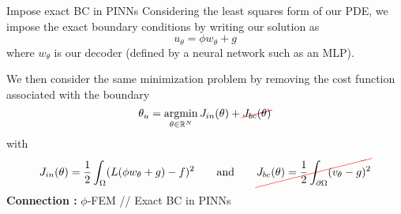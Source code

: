 \begin{frame}{Impose exact BC in PINNs}
	Considering the least squares form of our PDE, we impose the exact boundary conditions by writing our solution as
	\begin{equation*}
		u_\theta=\phi w_\theta + g
	\end{equation*}
	where $w_\theta$ is our decoder (defined by a neural network such as an MLP).
	
	We then consider the same minimization problem by removing the cost function associated with the boundary
	\begin{equation*}
		\displaystyle \theta_u=\argmin_{\theta\in\mathbb{R}^N} J_{in}(\theta)+\Ccancel[red]{J_{bc}(\theta)}
	\end{equation*}
	with 
	\begin{equation*}
		J_{in}(\theta)=\frac{1}{2}\int_\Omega (L(\phi w_\theta + g) - f)^2  \qquad \text{and} \qquad \Ccancel[red]{J_{bc}(\theta)=\frac{1}{2}\int_{\partial\Omega} (v_\theta-g)^2}
	\end{equation*}	
	\textbf{Connection :} \qquad $\phi$-FEM \hspace{5pt} // \hspace{5pt} Exact BC in PINNs
\end{frame}